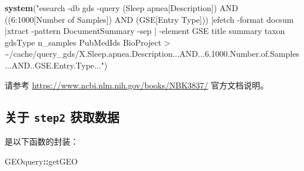 \documentclass[
]{article}
\newenvironment{Shaded}{\begin{snugshade}}{\end{snugshade}}
\newcommand{\KeywordTok}[1]{\textcolor[rgb]{0.13,0.29,0.53}{\textbf{#1}}}
\newcommand{\NormalTok}[1]{#1}
\newcommand{\OperatorTok}[1]{\textcolor[rgb]{0.81,0.36,0.00}{\textbf{#1}}}
\newcommand{\StringTok}[1]{\textcolor[rgb]{0.31,0.60,0.02}{#1}}
\begin{document}
\begin{Shaded}
\begin{Highlighting}[]
\KeywordTok{system}\NormalTok{(}\StringTok{"esearch {-}db gds {-}query \textquotesingle{}(Sleep apnea[Description]) AND ((6:1000[Number of Samples]) AND (GSE[Entry Type]))\textquotesingle{} |efetch {-}format docsum |xtract {-}pattern DocumentSummary {-}sep \textquotesingle{}|\textquotesingle{} {-}element GSE title summary taxon gdsType n\_samples PubMedIds BioProject \textgreater{} \textasciitilde{}/cache/query\_gds/X.Sleep.apnea.Description...AND...6.1000.Number.of.Samples...AND..GSE.Entry.Type..."}\NormalTok{)}
\end{Highlighting}
\end{Shaded}

请参考 \url{https://www.ncbi.nlm.nih.gov/books/NBK3837/} 官方文档说明。

\hypertarget{ux5173ux4e8e-step2-ux83b7ux53d6ux6570ux636e}{%
\subsection{\texorpdfstring{关于 \texttt{step2} 获取数据}{关于 step2 获取数据}}\label{ux5173ux4e8e-step2-ux83b7ux53d6ux6570ux636e}}

是以下函数的封装：

\begin{Shaded}
\begin{Highlighting}[]
\NormalTok{GEOquery}\OperatorTok{::}\NormalTok{getGEO}
\end{Highlighting}
\end{Shaded}
\end{document}
